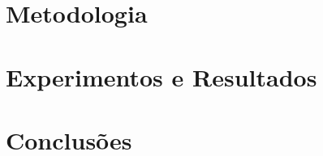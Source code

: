 \documentclass[12pt]{article}
\begin{document}

\section{Metodologia} 
\label{sec:metodology}



\section{Experimentos e Resultados}


\section{Conclusões}





\end{document}
